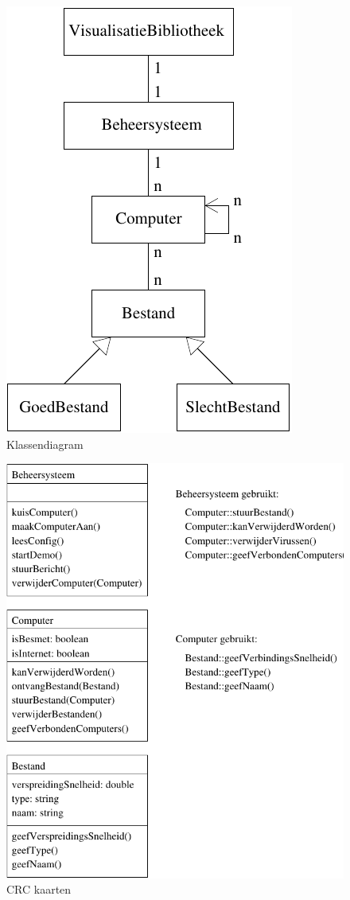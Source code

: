 \documentclass[a4paper,oneside]{report}
\begin{document}
\begin{figure}[h!]
\begin{center}
\includegraphics[scale=0.75]{klassen_diagram}
\caption{Klassendiagram}
\end{center}
\end{figure}
\newpage
\begin{figure}[h!]
\begin{center}
\includegraphics[scale=0.75]{crc_kaarten}
\caption{CRC kaarten}
\end{center}
\end{figure}
\newpage
\end{document}
